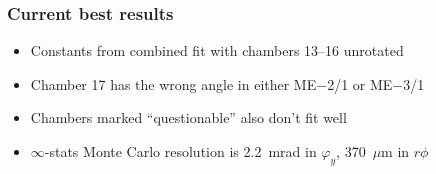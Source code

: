 \documentclass[compress]{beamer}
\begin{document}
\begin{frame}
\frametitle{Current best results}
\small
\begin{itemize}
\item Constants from combined fit with chambers 13--16 unrotated
\item Chamber 17 has the wrong angle in either ME$-$2/1 or ME$-$3/1
\item Chambers marked ``questionable'' also don't fit well
\item $\infty$-stats Monte Carlo resolution is 2.2~mrad in $\varphi_y$, 370~$\mu$m in $r\phi$
\end{itemize}

\begin{center}

\end{center}
\end{frame}
\end{document}
